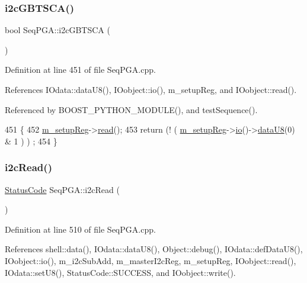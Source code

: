 \subsubsection{\texorpdfstring{i2c\+G\+B\+T\+S\+C\+A()}{i2cGBTSCA()}}
{\footnotesize\ttfamily bool Seq\+P\+G\+A\+::i2c\+G\+B\+T\+S\+CA (\begin{DoxyParamCaption}{ }\end{DoxyParamCaption})}



Definition at line 451 of file Seq\+P\+G\+A.\+cpp.



References I\+Odata\+::data\+U8(), I\+Oobject\+::io(), m\+\_\+setup\+Reg, and I\+Oobject\+::read().



Referenced by B\+O\+O\+S\+T\+\_\+\+P\+Y\+T\+H\+O\+N\+\_\+\+M\+O\+D\+U\+L\+E(), and test\+Sequence().


\begin{DoxyCode}
451                        \{
452   \hyperlink{classSeqPGA_a03269241e7fc26493cd0595beda334c2}{m\_setupReg}->\hyperlink{classIOobject_aa07610c11963b1db6710e3c76ceea456}{read}();
453   \textcolor{keywordflow}{return} (! ( \hyperlink{classSeqPGA_a03269241e7fc26493cd0595beda334c2}{m\_setupReg}->\hyperlink{classIOobject_af04fb94137c3d86849f478ac5afab5d1}{io}()->\hyperlink{classIOdata_a75e9c318dbac3a39402179070943d4bc}{dataU8}(0) & 1 ) ) ;
454 \}
\end{DoxyCode}
\mbox{\label{classSeqPGA_a7cd344df2be99f3a02b487f80e87b27e}} 
\subsubsection{\texorpdfstring{i2c\+Read()}{i2cRead()}\hspace{0.1cm}{\footnotesize\ttfamily [1/2]}}
{\footnotesize\ttfamily \hyperlink{classStatusCode}{Status\+Code} Seq\+P\+G\+A\+::i2c\+Read (\begin{DoxyParamCaption}{ }\end{DoxyParamCaption})}



Definition at line 510 of file Seq\+P\+G\+A.\+cpp.



References shell\+::data(), I\+Odata\+::data\+U8(), Object\+::debug(), I\+Odata\+::def\+Data\+U8(), I\+Oobject\+::io(), m\+\_\+i2c\+Sub\+Add, m\+\_\+master\+I2c\+Reg, m\+\_\+setup\+Reg, I\+Oobject\+::read(), I\+Odata\+::set\+U8(), Status\+Code\+::\+S\+U\+C\+C\+E\+SS, and I\+Oobject\+::write().



